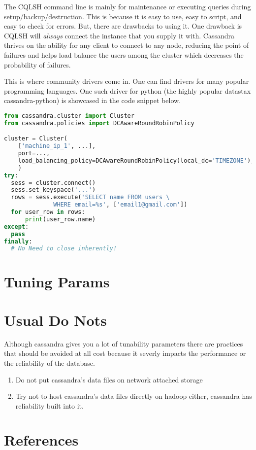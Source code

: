 \documentclass[9pt,twocolumn,twoside]{idsi}
\begin{document}
The CQLSH command line is mainly for maintenance or executing queries during setup/backup/destruction. This is because it is easy to use, easy to script, and easy to check for errors. But, there are drawbacks to using it. One drawback is CQLSH will \textit{always} connect the instance that you supply it with. Cassandra thrives on the ability for any client to connect to any node, reducing the point of failures and helps load balance the users among the cluster which decreases the probability of failures.

This is where community drivers come in. One can find drivers for many popular programming languages. One such driver for python (the highly popular datastax cassandra-python) is showcased in the code snippet below.

\begin{lstlisting}[language=Python]
from cassandra.cluster import Cluster
from cassandra.policies import DCAwareRoundRobinPolicy

cluster = Cluster(
    ['machine_ip_1', ...],
    port=...,
    load_balancing_policy=DCAwareRoundRobinPolicy(local_dc='TIMEZONE'),
    )
try:
  sess = cluster.connect()
  sess.set_keyspace('...')
  rows = sess.execute('SELECT name FROM users \
              WHERE email=%s', ['email1@gmail.com'])
  for user_row in rows:
      print(user_row.name)
except:
  pass
finally:
  # No Need to close inherently!
\end{lstlisting}

\section{Tuning Params}


\section{Usual Do Nots}

Although cassandra gives you a lot of tunability parameters there are practices that should be avoided at all cost because it severly impacts the performance or the reliability of the database.

\begin{enumerate}
\item Do not put cassandra's data files on network attached storage
\item Try not to host cassandra's data files directly on hadoop either, cassandra has reliability built into it.
\end{enumerate}


\section*{References}
\end{document}
